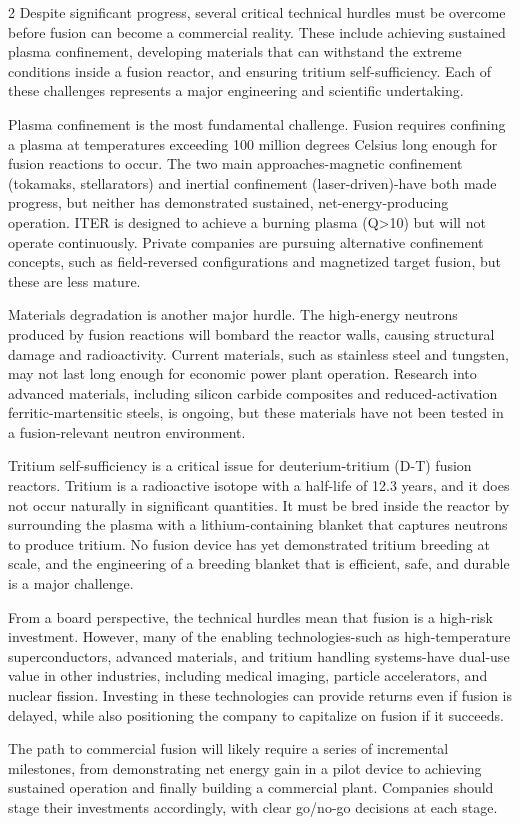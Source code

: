 \documentclass[10pt,a4paper]{article}
\begin{document}
\begin{multicols}{2}
{\small Despite significant progress, several critical technical hurdles must be overcome before fusion can become a commercial reality. These include achieving sustained plasma confinement, developing materials that can withstand the extreme conditions inside a fusion reactor, and ensuring tritium self-sufficiency. Each of these challenges represents a major engineering and scientific undertaking.}\par
{\small Plasma confinement is the most fundamental challenge. Fusion requires confining a plasma at temperatures exceeding 100 million degrees Celsius long enough for fusion reactions to occur. The two main approaches-magnetic confinement (tokamaks, stellarators) and inertial confinement (laser-driven)-have both made progress, but neither has demonstrated sustained, net-energy-producing operation. ITER is designed to achieve a burning plasma (Q>10) but will not operate continuously. Private companies are pursuing alternative confinement concepts, such as field-reversed configurations and magnetized target fusion, but these are less mature.}\par
{\small Materials degradation is another major hurdle. The high-energy neutrons produced by fusion reactions will bombard the reactor walls, causing structural damage and radioactivity. Current materials, such as stainless steel and tungsten, may not last long enough for economic power plant operation. Research into advanced materials, including silicon carbide composites and reduced-activation ferritic-martensitic steels, is ongoing, but these materials have not been tested in a fusion-relevant neutron environment.}\par
{\small Tritium self-sufficiency is a critical issue for deuterium-tritium (D-T) fusion reactors. Tritium is a radioactive isotope with a half-life of 12.3 years, and it does not occur naturally in significant quantities. It must be bred inside the reactor by surrounding the plasma with a lithium-containing blanket that captures neutrons to produce tritium. No fusion device has yet demonstrated tritium breeding at scale, and the engineering of a breeding blanket that is efficient, safe, and durable is a major challenge.}\par
{\small From a board perspective, the technical hurdles mean that fusion is a high-risk investment. However, many of the enabling technologies-such as high-temperature superconductors, advanced materials, and tritium handling systems-have dual-use value in other industries, including medical imaging, particle accelerators, and nuclear fission. Investing in these technologies can provide returns even if fusion is delayed, while also positioning the company to capitalize on fusion if it succeeds.}\par
{\small The path to commercial fusion will likely require a series of incremental milestones, from demonstrating net energy gain in a pilot device to achieving sustained operation and finally building a commercial plant. Companies should stage their investments accordingly, with clear go/no-go decisions at each stage.}\par
\end{multicols}
\label{chap:6:end}
\end{document}
